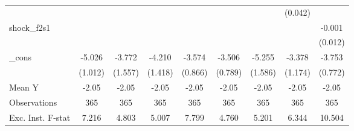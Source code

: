 {\begin{tabular}{l*{8}{c}}
            &                     &                     &                     &                     &                     &                     &     (0.042)         &                     \\
\addlinespace
shock\_f2s1  &                     &                     &                     &                     &                     &                     &                     &      -0.001         \\
            &                     &                     &                     &                     &                     &                     &                     &     (0.012)         \\
\addlinespace
\_cons      &      -5.026\sym{***}&      -3.772\sym{**} &      -4.210\sym{***}&      -3.574\sym{***}&      -3.506\sym{***}&      -5.255\sym{***}&      -3.378\sym{***}&      -3.753\sym{***}\\
            &     (1.012)         &     (1.557)         &     (1.418)         &     (0.866)         &     (0.789)         &     (1.586)         &     (1.174)         &     (0.772)         \\
\midrule
Mean Y      &       -2.05         &       -2.05         &       -2.05         &       -2.05         &       -2.05         &       -2.05         &       -2.05         &       -2.05         \\
Observations&         365         &         365         &         365         &         365         &         365         &         365         &         365         &         365         \\
Exc. Inst. F-stat&       7.216         &       4.803         &       5.007         &       7.799         &       4.760         &       5.201         &       6.344         &      10.504         \\
\bottomrule
\end{tabular}
}
